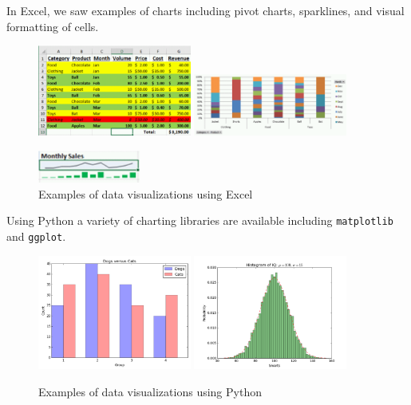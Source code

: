 \documentclass[xcolor=svgnames]{beamer} %
\begin{document}
\begin{frame}
In Excel, we saw examples of charts including pivot charts, sparklines, and visual formatting of cells.
\begin{figure}[htbp]
\begin{center}
 \includegraphics[width=0.45\textwidth]{excel1}  \includegraphics[width=0.45\textwidth]{excel2}
 
  \includegraphics[width=0.3\textwidth]{excel3}
\caption{Examples of data visualizations using Excel}
\label{default}
\end{center}
\end{figure}

\end{frame}



\begin{frame}
Using Python a variety of charting libraries are available including {\tt matplotlib} and {\tt ggplot}.
\begin{figure}[htbp]
\begin{center}
 \includegraphics[width=0.45\textwidth]{python1}  \includegraphics[width=0.45\textwidth]{python2}
\caption{Examples of data visualizations using Python}
\label{default}
\end{center}
\end{figure}

\end{frame}
\end{document}
